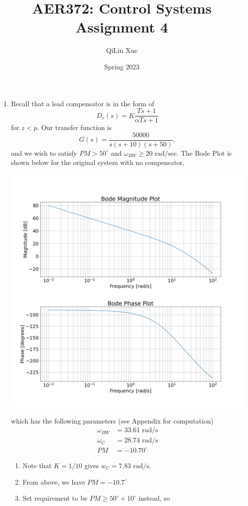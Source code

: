 \documentclass{article}
\title{AER372: Control Systems  \\ Assignment 4}
\author{QiLin Xue}
\date{Spring 2023}
\begin{document}
\maketitle
\begin{enumerate}[label=\textbf{4.\arabic*}]
\item Recall that a lead compensator is in the form of 
\begin{equation}
    D_c(s) = K\frac{Ts+1}{\alpha Ts + 1}
\end{equation}
for $z < p.$ Our transfer function is 
\begin{equation}
    G(s) = \frac{50000}{s(s+10)(s+50)},
\end{equation}
and we wish to satisfy $PM > 50^\circ$ and $\omega_{BW} \ge 20\text{ rad/sec}.$ The Bode Plot is shown below for the original system with no compensator,
\begin{center}
    \includegraphics[width=0.7\linewidth]{A4_imgs/q1_bode_nothing.png}
\end{center}
which has the following parameters (see Appendix for computation)
\begin{align}
    \omega_{BW} &= 33.61 \text{ rad/s} \\
    \omega_C &= 28.74 \text{ rad/s}\\
    PM &= -10.70^\circ
\end{align}
\begin{enumerate}[label=(\arabic*)]
    \item Note that $K=1/10$ gives $w_C = 7.83 \text{ rad/s}.$
    \item From above, we have $PM=-10.7^\circ$
    \item Set requirement to be $PM \ge 50^\circ + 10^\circ$ instead, so 

\end{enumerate}
\end{enumerate}
\end{document}
